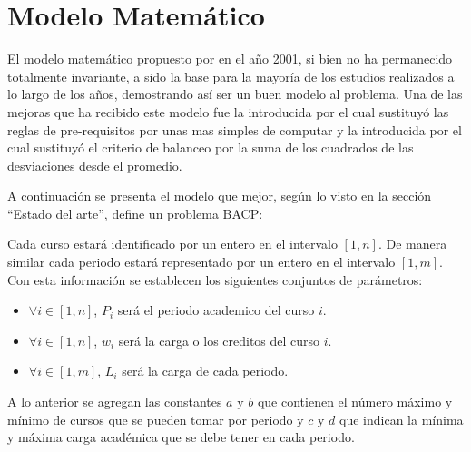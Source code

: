\documentclass[letter, 10pt]{article}
\begin{document}
\section{Modelo Matemático}
El modelo matemático propuesto por \cite{castro2001variable} en el año
2001, si bien no ha permanecido totalmente invariante, a sido la base
para la mayoría de los estudios realizados a lo largo de los años,
demostrando así ser un buen modelo al problema. Una de las mejoras que
ha recibido este modelo fue la introducida por \cite{hnich2002modelling}
el cual sustituyó las reglas de pre-requisitos por unas mas simples de
computar y la introducida por \cite{monette2007cp} el cual sustituyó el
criterio de balanceo por la suma de los cuadrados de las desviaciones
desde el promedio.

A continuación se presenta el modelo que mejor, según lo visto en la
sección ``Estado del arte'', define un problema BACP:

Cada curso estará identificado por un entero en el intervalo $[1,n]$. De
manera similar cada periodo estará representado por un entero en el
intervalo $[1,m]$. Con esta información se establecen los siguientes
conjuntos de parámetros:

\begin{itemize}
 \item $\forall i \in [1,n]$, $P_{i}$ será el periodo academico del curso $i$.
 \item $\forall i \in [1,n]$, $w_{i}$ será la carga o los creditos del curso $i$.
 \item $\forall i \in [1,m]$, $L_{i}$ será la carga de cada periodo.
\end{itemize}

A lo anterior se agregan las constantes $a$ y $b$ que contienen el número máximo
y mínimo de cursos que se pueden tomar por periodo y $c$ y $d$ que indican la
mínima y máxima carga académica que se debe tener en cada periodo.
\end{document}
